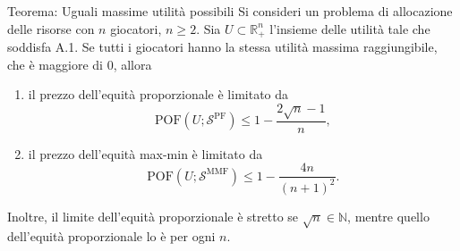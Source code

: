 \documentclass{beamer}
\begin{document}
\begin{frame}
	\begin{exampleblock}{Teorema: Uguali massime utilità possibili}
		Si consideri un problema di allocazione delle risorse con $n$ giocatori, $n \ge 2$. Sia $U \subset \mathbb{R}^n_+$ l'insieme delle utilità tale che soddisfa A.1. Se tutti i giocatori hanno la stessa utilità massima raggiungibile, che è maggiore di $0$, allora
		\begin{enumerate}
			\item il prezzo dell'equità proporzionale è limitato da
			\vspace{-0.3cm}
			\begin{equation}
				\text{POF}(U;\mathcal{S}^{\text{PF}}) \le 1 - \frac{2 \sqrt{n} - 1}{n},
			\end{equation}
			\item il prezzo dell'equità max-min è limitato da
			\vspace{-0.3cm}
			\begin{equation}
				\text{POF}(U;\mathcal{S}^{\text{MMF}}) \le 1 - \frac{4n}{(n+1)^2}.
			\end{equation}
		\end{enumerate}
		Inoltre, il limite dell'equità proporzionale è stretto se $\sqrt{n} \in \mathbb{N}$, mentre quello dell'equità proporzionale lo è per ogni $n$.
	\end{exampleblock}
\end{frame}
\end{document}

